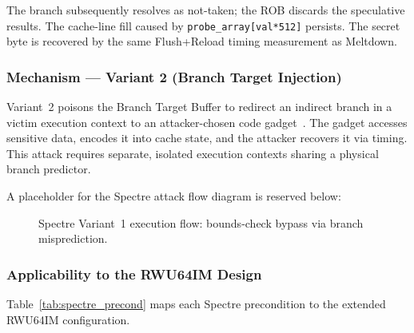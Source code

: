 The branch subsequently resolves as not-taken; the ROB discards the speculative
results.  The cache-line fill caused by \texttt{probe\_array[val*512]} persists.
The secret byte is recovered by the same Flush+Reload timing measurement as
Meltdown.

\subsubsection{Mechanism — Variant 2 (Branch Target Injection)}

Variant~2 poisons the Branch Target Buffer to redirect an indirect branch in a
victim execution context to an attacker-chosen code gadget~\cite{kocher2019spectre}.
The gadget accesses sensitive data, encodes it into cache state, and the attacker
recovers it via timing.  This attack requires separate, isolated execution contexts
sharing a physical branch predictor.

A placeholder for the Spectre attack flow diagram is reserved below:

\begin{figure}[h]
\centering
{}
\caption{Spectre Variant~1 execution flow: bounds-check bypass via branch misprediction.}
\label{fig:spectre_v1_flow}
\end{figure}

\subsubsection{Applicability to the RWU64IM Design}

Table~\ref{tab:spectre_precond} maps each Spectre precondition to the extended
RWU64IM configuration.

